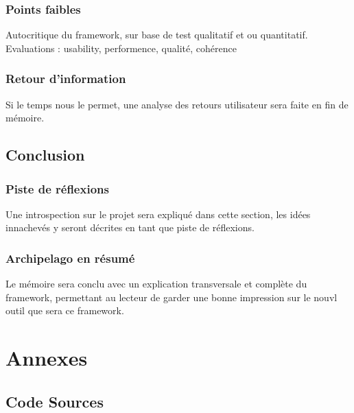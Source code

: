 \documentclass[a4paper,12pt,twoside, fleqn]{report}
\begin{document}
\section{Points faibles}
Autocritique du framework, sur base de test qualitatif et ou quantitatif.
Evaluations : usability, performence, qualité, cohérence
\section{Retour d'information}
Si le temps nous le permet, une analyse des retours utilisateur sera faite en fin de mémoire.
\chapter{Conclusion}
\section{Piste de réflexions}
Une introspection sur le projet sera expliqué dans cette section, les idées innachevés y seront décrites en tant que piste de réflexions.
\section{Archipelago en résumé}
Le mémoire sera conclu avec un explication transversale et complète du framework, permettant au lecteur de garder une bonne impression sur le nouvl outil que sera ce framework.
\part{Annexes}
\chapter{Code Sources}
\end{document}
